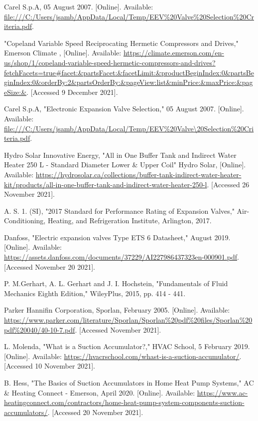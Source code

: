 \documentclass{ucalgarythesis}
\begin{document}
\begin{thebibliography}{9}
     Carel S.p.A, 05 August 2007. [Online]. Available: \url{file:///C:/Users/jsamb/AppData/Local/Temp/EEV\%20Valve\%20Selection\%20Criteria.pdf}.
    
     "Copeland Variable Speed Reciprocating Hermetic Compressors and Drives," Emerson Climate , [Online]. Available: \url{https://climate.emerson.com/en-us/shop/1/copeland-variable-speed-hermetic-compressors-and-drives?fetchFacets=true#facet:&partsFacet:&facetLimit:&productBeginIndex:0&partsBeginIndex:0&orderBy:2&partsOrderBy:&pageView:list&minPrice:&maxPrice:&pageSize:&}. [Accessed 9 December 2021].
    
     Carel S.p.A, "Electronic Expansion Valve Selection," 05 August 2007. [Online]. Available: \url{file:///C:/Users/jsamb/AppData/Local/Temp/EEV\%20Valve\20Selection\%20Criteria.pdf}.
    
     Hydro Solar Innovative Energy, "All in One Buffer Tank and Indirect Water Heater 250 L - Standard Diameter Lower \& Upper Coil" Hydro Solar, [Online]. Available: \url{https://hydrosolar.ca/collections/buffer-tank-indirect-water-heater-kit/products/all-in-one-buffer-tank-and-indirect-water-heater-250-l}. [Accessed 26 November 2021].
    
     A. S. 1. (SI), "2017 Standard for Performance Rating of Expansion Valves," Air-Conditioning, Heating, and Refrigeration Institute, Arlington, 2017.
    
     Danfoss, "Electric expansion valves Type ETS 6 Datasheet," August 2019. [Online]. Available: \url{https://assets.danfoss.com/documents/37229/AI227986437323en-000901.pdf}. [Accessed November 20 2021].
    
     P. M.Gerhart, A. L. Gerhart and J. I. Hochstein, "Fundamentals of Fluid Mechanics Eighth Edition," WileyPlus, 2015, pp. 414 - 441.
    
     Parker Hannifin Corporation, Sporlan, February 2005. [Online]. Available: \url{https://www.parker.com/literature/Sporlan/Sporlan\%20pdf\%20files/Sporlan\%20pdf\%20040/40-10-7.pdf}. [Accessed November 2021].
    
     L. Molenda, "What is a Suction Accumulator?," HVAC School, 5 February 2019. [Online]. Available: \url{https://hvacrschool.com/whast-is-a-suction-accumulator/}. [Accessed 10 November 2021].
    
     B. Hess, "The Basics of Suction Accumulators in Home Heat Pump Systems," AC \& Heating Connect - Emerson, April 2020. [Online]. Available: \url{https://www.ac-heatingconnect.com/contractors/home-heat-pump-system-components-suction-accumulators/}. [Accessed 20 November 2021].
    

\end{thebibliography}
\end{document}
